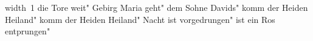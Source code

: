 \ifx\mxversion\undefined
  
  
  
  
\fi

%
\hbox{\pdfximage width 1\pdfrefximage\pdflastximage}\vfill\eject
\tableofcontents
\normalmusicsize
 die Tore weit"
 Gebirg Maria geht"
 dem Sohne Davids"
 komm der Heiden Heiland"
 komm der Heiden Heiland"
 Nacht ist vorgedrungen"
 ist ein Ros entprungen"
\bookbye